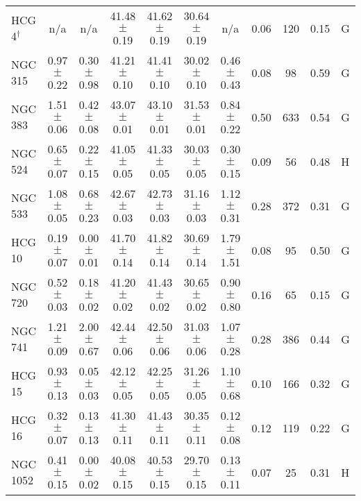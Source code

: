 \begin{table*}
\begin{center}
\begin{tabular}{@{}lcccccccccl@{}}
HCG 4$^{\dagger}$    &  n/a              &  n/a              &  41.48 $\pm$ 0.19  &  41.62  $\pm$ 0.19  &  30.64 $\pm$ 0.19  &  n/a              &  0.06         &  120                &  0.15                &  G      \\
NGC 315              &  0.97 $\pm$ 0.22  &  0.30 $\pm$ 0.98  &  41.21 $\pm$ 0.10  &  41.41  $\pm$ 0.10  &  30.02 $\pm$ 0.10  &  0.46 $\pm$ 0.43  &  0.08         &  98                 &  0.59                &  G      \\
NGC 383              &  1.51 $\pm$ 0.06  &  0.42 $\pm$ 0.08  &  43.07 $\pm$ 0.01  &  43.10  $\pm$ 0.01  &  31.53 $\pm$ 0.01  &  0.84 $\pm$ 0.22  &  0.50         &  633                &  0.54                &  G      \\
NGC 524              &  0.65 $\pm$ 0.07  &  0.22 $\pm$ 0.15  &  41.05 $\pm$ 0.05  &  41.33  $\pm$ 0.05  &  30.03 $\pm$ 0.05  &  0.30 $\pm$ 0.15  &  0.09         &  56                 &  0.48                &  H      \\
NGC 533              &  1.08 $\pm$ 0.05  &  0.68 $\pm$ 0.23  &  42.67 $\pm$ 0.03  &  42.73  $\pm$ 0.03  &  31.16 $\pm$ 0.03  &  1.12 $\pm$ 0.31  &  0.28         &  372                &  0.31                &  G      \\
HCG 10               &  0.19 $\pm$ 0.07  &  0.00 $\pm$ 0.01  &  41.70 $\pm$ 0.14  &  41.82  $\pm$ 0.14  &  30.69 $\pm$ 0.14  &  1.79 $\pm$ 1.51  &  0.08         &  95                 &  0.50                &  G      \\
NGC 720              &  0.52 $\pm$ 0.03  &  0.18 $\pm$ 0.02  &  41.20 $\pm$ 0.02  &  41.43  $\pm$ 0.02  &  30.65 $\pm$ 0.02  &  0.90 $\pm$ 0.80  &  0.16         &  65                 &  0.15                &  G      \\
NGC 741              &  1.21 $\pm$ 0.09  &  2.00 $\pm$ 0.67  &  42.44 $\pm$ 0.06  &  42.50  $\pm$ 0.06  &  31.03 $\pm$ 0.06  &  1.07 $\pm$ 0.28  &  0.28         &  386                &  0.44                &  G      \\
HCG 15               &  0.93 $\pm$ 0.13  &  0.05 $\pm$ 0.03  &  42.12 $\pm$ 0.05  &  42.25  $\pm$ 0.05  &  31.26 $\pm$ 0.05  &  1.10 $\pm$ 0.68  &  0.10         &  166                &  0.32                &  G      \\
HCG 16               &  0.32 $\pm$ 0.07  &  0.13 $\pm$ 0.13  &  41.30 $\pm$ 0.11  &  41.43  $\pm$ 0.11  &  30.35 $\pm$ 0.11  &  0.12 $\pm$ 0.08  &  0.12         &  119                &  0.22                &  G      \\
NGC 1052             &  0.41 $\pm$ 0.15  &  0.00 $\pm$ 0.02  &  40.08 $\pm$ 0.15  &  40.53  $\pm$ 0.15  &  29.70 $\pm$ 0.15  &  0.13 $\pm$ 0.11  &  0.07         &  25                 &  0.31                &  H      \\

\end{tabular}
\end{center}
\end{table*}
